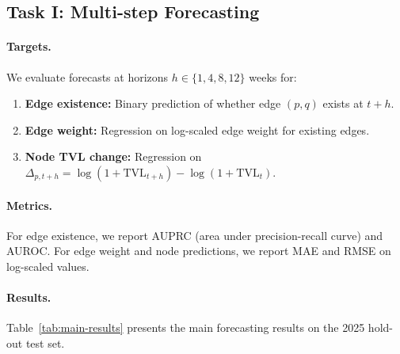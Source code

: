 \subsection{Task I: Multi-step Forecasting}
\label{subsec:forecast}

\paragraph{Targets.}
We evaluate forecasts at horizons $h \in \{1, 4, 8, 12\}$ weeks for:
\begin{enumerate}
  \item \textbf{Edge existence:} Binary prediction of whether edge $(p,q)$ exists at $t+h$.
  \item \textbf{Edge weight:} Regression on log-scaled edge weight for existing edges.
  \item \textbf{Node TVL change:} Regression on $\Delta_{p,t+h} = \log(1+\text{TVL}_{t+h}) - \log(1+\text{TVL}_t)$.
\end{enumerate}

\paragraph{Metrics.}
For edge existence, we report AUPRC (area under precision-recall curve) and AUROC. For edge weight and node predictions, we report MAE and RMSE on log-scaled values.

\paragraph{Results.}
Table~\ref{tab:main-results} presents the main forecasting results on the 2025 hold-out test set.

